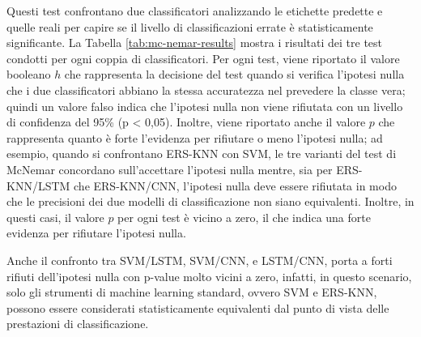 Questi test confrontano due classificatori analizzando le etichette predette e quelle reali per capire se il livello di classificazioni errate è statisticamente significante. La Tabella \ref{tab:mc-nemar-results} mostra i risultati dei tre test condotti per ogni coppia di classificatori.
Per ogni test, viene riportato il valore booleano $h$ che rappresenta la decisione del test quando si verifica l'ipotesi nulla che i due classificatori abbiano la stessa accuratezza nel prevedere la classe vera; quindi un valore falso indica che l'ipotesi nulla non viene rifiutata con un livello di confidenza del 95\% (p < 0,05).
Inoltre, viene riportato anche il valore $p$ che rappresenta quanto è forte l'evidenza per rifiutare o meno l'ipotesi nulla; ad esempio, quando si confrontano ERS-KNN con SVM, le tre varianti del test di McNemar concordano sull'accettare l'ipotesi nulla mentre, sia per ERS-KNN/LSTM che ERS-KNN/CNN, l'ipotesi nulla deve essere rifiutata in modo che le precisioni dei due modelli di classificazione non siano equivalenti. Inoltre, in questi casi, il valore $p$ per ogni test è vicino a zero, il che indica una forte evidenza per rifiutare l'ipotesi nulla.

Anche il confronto tra SVM/LSTM, SVM/CNN, e LSTM/CNN, porta a forti rifiuti dell'ipotesi nulla con p-value molto vicini a zero, infatti, in questo scenario, solo gli strumenti di machine learning standard, ovvero SVM e ERS-KNN, possono essere considerati statisticamente equivalenti dal punto di vista delle prestazioni di classificazione.

